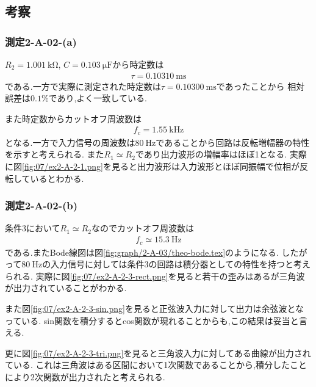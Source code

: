 \subsection{考察}
\subsubsection{測定2-A-02-(a)}
$R_2=1.001\ \si{\kilo\ohm}$, $C=0.103\ \si{\micro\farad}$から時定数は
\begin{align}
  \tau=0.10310\ \si{\milli\second}
\end{align}
である.一方で実際に測定された時定数は$\tau=0.10300\ \si{\milli\second}$であったことから
相対誤差は$0.1\%$であり,よく一致している.

また時定数からカットオフ周波数は
\begin{align}
  f_c=1.55\ \si{\kilo\hertz}
\end{align}
となる.一方で入力信号の周波数は$80\ \si{\hertz}$であることから回路は反転増幅器の特性を示すと考えられる.
また$R_1\simeq R_2$であり出力波形の増幅率はほぼ1となる.
実際に図\ref{fig:07/ex2-A-2-1.png}を見ると出力波形は入力波形とほぼ同振幅で位相が反転しているとわかる.
\subsubsection{測定2-A-02-(b)}
条件3において$R_1\simeq R_2$なのでカットオフ周波数は
\begin{align}
  f_c\simeq15.3\ \si{\hertz}
\end{align}
である.またBode線図は図\ref{fig:graph/2-A-03/theo-bode.tex}のようになる.
したがって$80\ \si{\hertz}$の入力信号に対しては条件3の回路は積分器としての特性を持つと考えられる.
実際に図\ref{fig:07/ex2-A-2-3-rect.png}を見ると若干の歪みはあるが三角波が出力されていることがわかる.

また図\ref{fig:07/ex2-A-2-3-sin.png}を見ると正弦波入力に対して出力は余弦波となっている.
sin関数を積分するとcos関数が現れることからも,この結果は妥当と言える.

更に図\ref{fig:07/ex2-A-2-3-tri.png}を見ると三角波入力に対してある曲線が出力されている.
これは三角波はある区間において1次関数であることから,積分したことにより2次関数が出力されたと考えられる.
